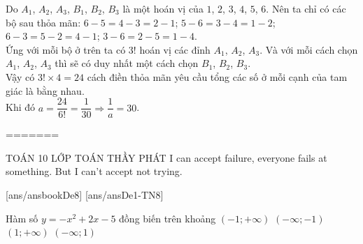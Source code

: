 \begin{ex}
{{}\noindent
Do $A_1$, $A_2$, $A_3$,  $B_1$, $B_2$, $B_3$ là một hoán vị của $1$, $2$, $3$, $4$, $5$, $6$.
Nên ta chỉ có các bộ sau thỏa mãn: $6-5 = 4-3 = 2-1$; $5-6 = 3-4 = 1-2$; $6-3 = 5-2 = 4-1$; $3-6 = 2-5 = 1-4$.\\
Ứng với mỗi bộ ở trên ta có $3!$ hoán vị các đỉnh $A_1$, $A_2$, $A_3$.
Và với mỗi cách chọn $A_1$, $A_2$, $A_3$ thì sẽ có duy nhất một cách chọn $B_1$, $B_2$, $B_3$.\\
Vậy có $3!\times 4=24$ cách điền thỏa mãn yêu cầu  tổng các số ở mỗi cạnh của tam giác là bằng nhau.\\
Khi đó $a=\dfrac{\mathrm{24}}{6!}=\dfrac{1}{30}\Rightarrow \dfrac{1}{a}=30$.
}
\end{ex}

=======
\begin{name}
	{\tenchude}
	{TOÁN 10}
	{LỚP TOÁN THẦY PHÁT}
	{I can accept failure, everyone fails at something. But I can’t accept not trying.}
\end{name}
[ans/ansbookDe8]
\TN
{}[ans/ansDe1-TN8]
\begin{ex}%
Hàm số $y=-x^2+2x-5$ đồng biến trên khoảng
\choice
{$(-1 ;+\infty)$}
{$(-\infty ;-1)$}
{$(1 ;+\infty)$}
{\True $(-\infty ; 1)$}
\end{ex}

